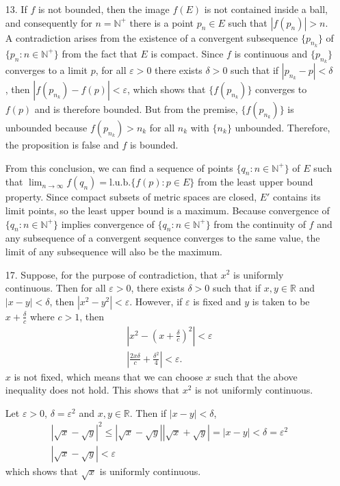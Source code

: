 \documentclass[a4paper,12pt]{article}
\begin{document}
\begin{enumerate}
        \item[13.]
            If $f$ is not bounded, then the image $f(E)$ is not contained inside a ball, and consequently for $n = \mathbb{N}^+$ there is a point $p_n \in E$ such that $|f(p_n)| > n$. A contradiction arises from the existence of a convergent subsequence $\{ p_{n_k} \}$ of $\{ p_n : n \in \mathbb{N}^+ \}$ from the fact that $E$ is compact. Since $f$ is continuous and $\{ p_{n_k} \}$ converges to a limit $p$, for all $\varepsilon > 0$ there exists $\delta > 0$ such that if $|p_{n_k} - p| < \delta$, then $|f(p_{n_k}) - f(p)| < \varepsilon$, which shows that $\{ f(p_{n_k}) \}$ converges to $f(p)$ and is therefore bounded. But from the premise, $\{ f(p_{n_k}) \}$ is unbounded because $f(p_{n_k}) > n_k$ for all $n_k$ with $\{ n_k \}$ unbounded. Therefore, the proposition is false and $f$ is bounded. \par
            From this conclusion, we can find a sequence of points $\{ q_n : n \in \mathbb{N}^+ \}$ of $E$ such that $\lim_{n \to \infty} f(q_n) = \text{l.u.b.} \{ f(p) : p \in E \}$ from the least upper bound property. Since compact subsets of metric spaces are closed, $E'$ contains its limit points, so the least upper bound is a maximum. Because convergence of $\{ q_n : n \in \mathbb{N}^+ \}$ implies convergence of $\{ q_n : n \in \mathbb{N}^+ \}$ from the continuity of $f$ and any subsequence of a convergent sequence converges to the same value, the limit of any subsequence will also be the maximum.

        \item[17.]
            Suppose, for the purpose of contradiction, that $x^2$ is uniformly continuous. Then for all $\varepsilon > 0$, there exists $\delta > 0$ such that if $x, y \in \mathbb{R}$ and $|x - y| < \delta$, then $|x^2 - y^2| < \varepsilon$. However, if $\varepsilon$ is fixed and $y$ is taken to be $x + \frac{\delta}{c}$ where $c > 1$, then
            \begin{gather*}
                \left| x^2 - (x + \frac{\delta}{c})^2 \right| < \varepsilon \\
                \left| \frac{2x \delta}{c} + \frac{\delta^2}{4} \right| < \varepsilon.
            \end{gather*}
            $x$ is not fixed, which means that we can choose $x$ such that the above inequality does not hold. This shows that $x^2$ is not uniformly continuous. \par
            Let $\varepsilon > 0$, $\delta = \varepsilon^2$ and $x, y \in \mathbb{R}$. Then if $|x - y| < \delta$,
            \begin{gather*}
                |\sqrt{x} - \sqrt{y}|^2 \leq |\sqrt{x} - \sqrt{y}| |\sqrt{x} + \sqrt{y}| = |x - y| < \delta = \varepsilon^2 \\
                |\sqrt{x} - \sqrt{y}| < \varepsilon
            \end{gather*}
            which shows that $\sqrt{x}$ is uniformly continuous.

    \end{enumerate}
\end{document}
